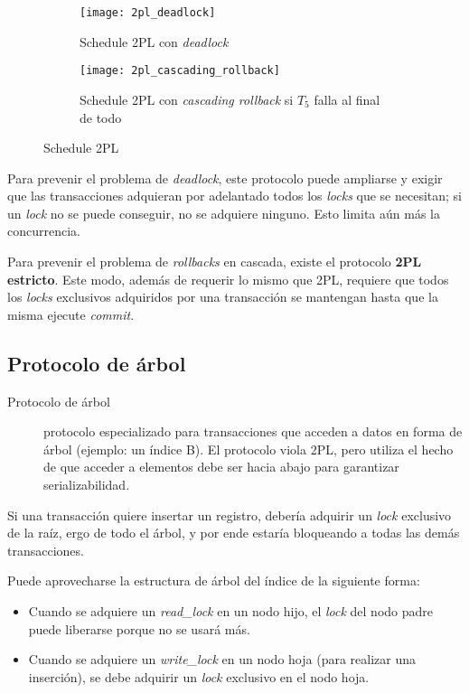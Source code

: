 \documentclass[a4paper, twoside]{article}
\begin{document}
\begin{figure}[H]
	\centering
	\begin{subfigure}{0.48\textwidth}
		\centering
		\texttt{[image: 2pl\_deadlock]}
		\caption{Schedule 2PL con \emph{deadlock}}	
	\end{subfigure}
	\begin{subfigure}{0.48\textwidth}
		\centering
		\texttt{[image: 2pl\_cascading\_rollback]}
		\caption{Schedule 2PL con \emph{cascading rollback }si $T_{5}$ falla al final de todo}
	\end{subfigure}
	\caption{Schedule 2PL}
\end{figure}

Para prevenir el problema de \emph{deadlock}, este protocolo puede ampliarse y exigir que las transacciones adquieran por adelantado todos los \emph{locks} que se necesitan; si un \emph{lock} no se puede conseguir, no se adquiere ninguno. Esto limita aún más la concurrencia.

Para prevenir el problema de \emph{rollbacks} en cascada, existe el protocolo \textbf{2PL estricto}. Este modo, además de requerir lo mismo que 2PL, requiere que todos los \emph{locks} exclusivos adquiridos por una transacción se mantengan hasta que la misma ejecute \emph{commit}.

\subsection{Protocolo de árbol}
\begin{description}
	\item[Protocolo de árbol] protocolo especializado para transacciones que acceden a datos en forma de árbol (ejemplo: un índice B). El protocolo viola 2PL, pero utiliza el hecho de que acceder a elementos debe ser hacia abajo para garantizar serializabilidad.
\end{description}

Si una transacción quiere insertar un registro, debería adquirir un \emph{lock} exclusivo de la raíz, ergo de todo el árbol, y por ende estaría bloqueando a todas las demás transacciones.

Puede aprovecharse la estructura de árbol del índice de la siguiente forma:
\begin{itemize}
	\item Cuando se adquiere un \emph{read\_lock} en un nodo hijo, el \emph{lock} del nodo padre puede liberarse porque no se usará más.
	\item Cuando se adquiere un \emph{write\_lock} en un nodo hoja (para realizar una inserción), se debe adquirir un \emph{lock }exclusivo en el nodo hoja.
\end{itemize}
\end{document}
